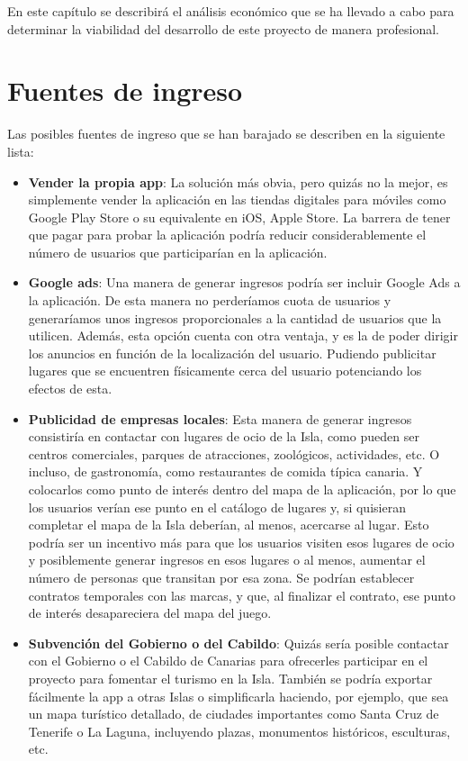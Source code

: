 En este capítulo se describirá el análisis económico que se ha llevado a cabo para determinar la viabilidad del desarrollo de este proyecto de manera profesional.

\section{Fuentes de ingreso}
Las posibles fuentes de ingreso que se han barajado se describen en la siguiente lista:
\begin{itemize}
\item \textbf{Vender la propia app}: La solución más obvia, pero quizás no la mejor, es simplemente vender la aplicación en las tiendas digitales para móviles como Google Play Store o su equivalente en iOS, Apple Store. La barrera de tener que pagar para probar la aplicación podría reducir considerablemente el número de usuarios que participarían en la aplicación.

\item \textbf{Google ads}: Una manera de generar ingresos podría ser incluir Google Ads a la aplicación. De esta manera no perderíamos cuota de usuarios y generaríamos unos ingresos proporcionales a la cantidad de usuarios que la utilicen. Además, esta opción cuenta con otra ventaja, y es la de poder dirigir los anuncios en función de la localización del usuario. Pudiendo publicitar lugares que se encuentren físicamente cerca del usuario potenciando los efectos de esta.

\item \textbf{Publicidad de empresas locales}: Esta manera de generar ingresos consistiría en contactar con lugares de ocio de la Isla, como pueden ser centros comerciales, parques de atracciones, zoológicos, actividades, etc. O incluso, de gastronomía, como restaurantes de comida típica canaria. Y colocarlos como punto de interés dentro del mapa de la aplicación, por lo que los usuarios verían ese punto en el catálogo de lugares y, si quisieran completar el mapa de la Isla deberían, al menos, acercarse al lugar. Esto podría ser un incentivo más para que los usuarios visiten esos lugares de ocio y posiblemente generar ingresos en esos lugares o al menos, aumentar el número de personas que transitan por esa zona. Se podrían establecer contratos temporales con las marcas, y que, al finalizar el contrato, ese punto de interés desapareciera del mapa del juego.

\item \textbf{Subvención del Gobierno o del Cabildo}: Quizás sería posible contactar con el Gobierno o el Cabildo de Canarias para ofrecerles participar en el proyecto para fomentar el turismo en la Isla. También se podría exportar fácilmente la app a otras Islas o simplificarla haciendo, por ejemplo, que sea un mapa turístico detallado, de ciudades importantes como Santa Cruz de Tenerife o La Laguna, incluyendo plazas, monumentos históricos, esculturas, etc.
\end{itemize}

